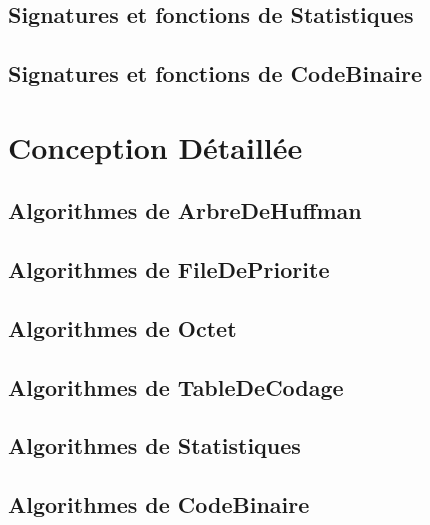 \documentclass[10pt]{article}
\begin{document}
        \subsection{Signatures et fonctions de Statistiques}
        
        \subsection{Signatures et fonctions de CodeBinaire}
        
    \section{Conception Détaillée}
        \subsection{Algorithmes de ArbreDeHuffman}
        
        \subsection{Algorithmes de FileDePriorite}
        
        \subsection{Algorithmes de Octet}
        
        \subsection{Algorithmes de TableDeCodage}
        
        \subsection{Algorithmes de Statistiques}
        
        \subsection{Algorithmes de CodeBinaire}
        
\end{document}
